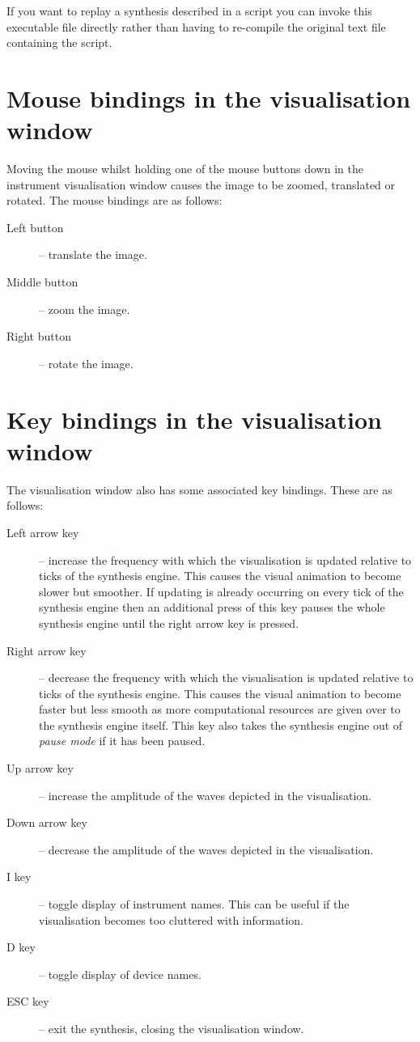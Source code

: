 If you want to replay a synthesis described in a script you can invoke
this executable file directly rather than having to re-compile the original
text file containing the script.

\section{Mouse bindings in the visualisation window}
Moving the mouse whilst holding one of the mouse buttons down in the
instrument visualisation window causes the image to be zoomed, translated
or rotated. The mouse bindings are as follows:

\renewcommand{\descriptionlabel}[1]%
	{\hspace{\labelsep}\textbf{#1}}
\begin{description}
\item[Left button] -- translate the image.
\item[Middle button] -- zoom the image.
\item[Right button] -- rotate the image.
\end{description}

\section{Key bindings in the visualisation window}
The visualisation window also has some associated key bindings. These are
as follows:

\begin{description}
\item[Left arrow key] -- increase the frequency with which the visualisation
is updated relative to ticks of the synthesis engine. This causes the
visual animation to become slower but smoother. If updating is already
occurring on every tick of the synthesis engine then an additional
press of this key pauses the whole synthesis engine until the right arrow key
is pressed.
\item[Right arrow key] -- decrease the frequency with which the visualisation
is updated relative to ticks of the synthesis engine. This causes the
visual animation to become faster but less smooth as more computational
resources are given over to the synthesis engine itself. This key also takes
the synthesis engine out of \emph{pause mode} if it has been paused.
\item[Up arrow key] -- increase the amplitude of the waves depicted in the
visualisation.
\item[Down arrow key] -- decrease the amplitude of the waves depicted in the
visualisation.
\item[I key] -- toggle display of instrument names. This can be useful if
the visualisation becomes too cluttered with information.
\item[D key] -- toggle display of device names.
\item[ESC key] -- exit the synthesis, closing the visualisation window.
\end{description}

